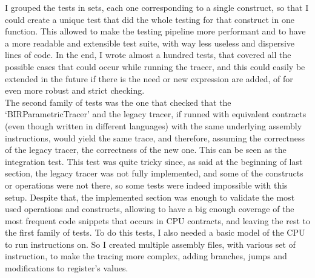 I grouped the tests in sets, each one corresponding to a single construct, so
that I could create a unique test that did the whole testing for that construct
in one function. This allowed to make the testing pipeline more performant and to
have a more readable and extensible test suite, with way less useless and
dispersive lines of code. In the end, I wrote almost a hundred tests, that covered
all the possible cases that could occur while running the tracer, and this could
easily be extended in the future if there is the need or new expression are
added, of for even more robust and strict checking. \\

The second family of tests was the one that checked that the `BIRParametricTracer'
and the legacy tracer, if runned with equivalent contracts (even though written in
different languages) with the same underlying assembly instructions, would yield
the same trace, and therefore, assuming the correctness of the legacy tracer,
the correctness of the new one. This can be seen as the integration test. This
test was quite tricky since, as said at the beginning of last section, the
legacy tracer was not fully implemented, and some of the constructs or operations
were not there, so some tests were indeed impossible with this setup. Despite that,
the implemented section was enough to validate the most used operations and
constructs, allowing to have a big enough coverage of the most frequent code snippets
that occurs in CPU contracts, and leaving the rest to the first family of tests.
To do this tests, I also needed a basic model of the CPU to run instructions on.
So I created multiple assembly files, with various set of instruction, to make the
tracing more complex, adding branches, jumps and modifications to register's values.

